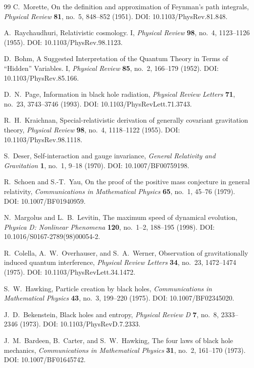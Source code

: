 \documentclass[11pt,a4paper]{article}
\theoremstyle{definition}
\begin{document}
\begin{thebibliography}{99}
C.~Morette, On the definition and approximation of Feynman's path integrals, \textit{Physical Review} \textbf{81}, no.~5, 848--852 (1951). DOI: 10.1103/PhysRev.81.848.

A.~Raychaudhuri, Relativistic cosmology. I, \textit{Physical Review} \textbf{98}, no.~4, 1123--1126 (1955). DOI: 10.1103/PhysRev.98.1123.

D.~Bohm, A Suggested Interpretation of the Quantum Theory in Terms of ``Hidden'' Variables. I, \textit{Physical Review} \textbf{85}, no.~2, 166--179 (1952). DOI: 10.1103/PhysRev.85.166.

D.~N.~Page, Information in black hole radiation, \textit{Physical Review Letters} \textbf{71}, no.~23, 3743--3746 (1993). DOI: 10.1103/PhysRevLett.71.3743.

R.~H.~Kraichnan, Special-relativistic derivation of generally covariant gravitation theory, \textit{Physical Review} \textbf{98}, no.~4, 1118--1122 (1955). DOI: 10.1103/PhysRev.98.1118.

S.~Deser, Self-interaction and gauge invariance, \textit{General Relativity and Gravitation} \textbf{1}, no.~1, 9--18 (1970). DOI: 10.1007/BF00759198.

R.~Schoen and S.-T.~Yau, On the proof of the positive mass conjecture in general relativity, \textit{Communications in Mathematical Physics} \textbf{65}, no.~1, 45--76 (1979). DOI: 10.1007/BF01940959.

N.~Margolus and L.~B.~Levitin, The maximum speed of dynamical evolution, \textit{Physica D: Nonlinear Phenomena} \textbf{120}, no.~1--2, 188--195 (1998). DOI: 10.1016/S0167-2789(98)00054-2.

R.~Colella, A.~W.~Overhauser, and S.~A.~Werner, Observation of gravitationally induced quantum interference, \textit{Physical Review Letters} \textbf{34}, no.~23, 1472--1474 (1975). DOI: 10.1103/PhysRevLett.34.1472.

S.~W.~Hawking, Particle creation by black holes, \textit{Communications in Mathematical Physics} \textbf{43}, no.~3, 199--220 (1975). DOI: 10.1007/BF02345020.

J.~D.~Bekenstein, Black holes and entropy, \textit{Physical Review D} \textbf{7}, no.~8, 2333--2346 (1973). DOI: 10.1103/PhysRevD.7.2333.

J.~M.~Bardeen, B.~Carter, and S.~W.~Hawking, The four laws of black hole mechanics, \textit{Communications in Mathematical Physics} \textbf{31}, no.~2, 161--170 (1973). DOI: 10.1007/BF01645742.


\end{thebibliography}
\end{document}
